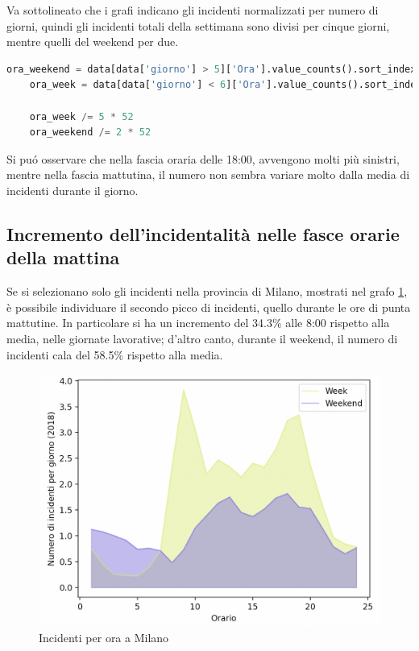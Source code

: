 \documentclass[a4paper]{report}
\begin{document}
Va sottolineato che i grafi indicano gli incidenti normalizzati per numero di 
giorni, quindi gli incidenti totali della settimana sono divisi per cinque giorni, 
mentre quelli del weekend per due.

\begin{lstlisting}[language=Python]
    ora_weekend = data[data['giorno'] > 5]['Ora'].value_counts().sort_index()
    ora_week = data[data['giorno'] < 6]['Ora'].value_counts().sort_index()

    ora_week /= 5 * 52
    ora_weekend /= 2 * 52
\end{lstlisting}

Si pu\'o osservare che nella fascia oraria delle 18:00, 
avvengono molti più sinistri, mentre nella fascia mattutina, 
il numero non sembra variare molto dalla media di incidenti durante il giorno.

\subsection{Incremento dell'incidentalità nelle fasce orarie della mattina}

Se si selezionano solo gli incidenti nella provincia di Milano, mostrati nel grafo 
\ref{fig:week-weekend-milano}, è possibile individuare 
il secondo picco di incidenti, quello durante le ore di punta mattutine.
In particolare si ha un incremento del 34.3\% alle 8:00 rispetto alla media, nelle giornate lavorative;
d'altro canto, durante il weekend, il numero di incidenti cala del 58.5\% rispetto alla media.

\begin{figure}
    \includegraphics[width=\linewidth]{../src/incidenti/incidenti_senza_coords/ore_punta/week_weekend_milano.png}
    \caption{Incidenti per ora a Milano}
    \label{fig:week-weekend-milano}
\end{figure}
\end{document}
